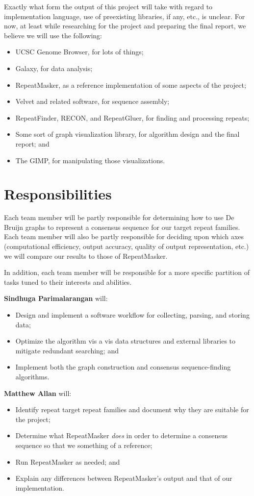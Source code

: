 \documentclass[dvips,12pt]{article}
\begin{document}
Exactly what form the output of this project will take with regard to
implementation language, use of preexisting libraries, if any, etc., is
unclear.  For now, at least while researching for the project and
preparing the final report, we believe we will use the following:
\begin{itemize}
\item UCSC Genome Browser,
  for lots of things;
\item Galaxy,
  for data analysis;
\item RepeatMasker,
  as a reference implementation of some aspects of the project;
\item Velvet and related software,
  for sequence assembly;
\item RepeatFinder, RECON, and RepeatGluer,
  for finding and processing repeats;
\item Some sort of graph visualization library, for algorithm design and
  the final report; and
\item The GIMP, for manipulating those visualizations.
\end{itemize}

\section{Responsibilities}

Each team member will be partly responsible for determining how to use
De Bruijn graphs to represent a consensus sequence for our target repeat
families.  Each team member will also be partly responsible for deciding
upon which axes (computational efficiency, output accuracy, quality of
output representation, etc.) we will compare our results to those of
RepeatMasker.

In addition, each team member will be responsible for a more specific
partition of tasks tuned to their interests and abilities.

\textbf{Sindhuga Parimalarangan} will:
\begin{itemize}
\item Design and implement a software workflow for collecting, parsing,
  and storing data;
\item Optimize the algorithm vis a vis data structures and external
  libraries to mitigate redundant searching; and
\item Implement both the graph construction and consensus
  sequence-finding algorithms.
\end{itemize}

\textbf{Matthew Allan} will:
\begin{itemize}
\item Identify repeat target repeat families and document why they are
  suitable for the project;
\item Determine what RepeatMasker \emph{does} in order to determine a
  consensus sequence so that we something of a reference;
\item Run RepeatMasker as needed; and
\item Explain any differences between RepeatMasker's output and that of
  our implementation.
\end{itemize}
\end{document}

